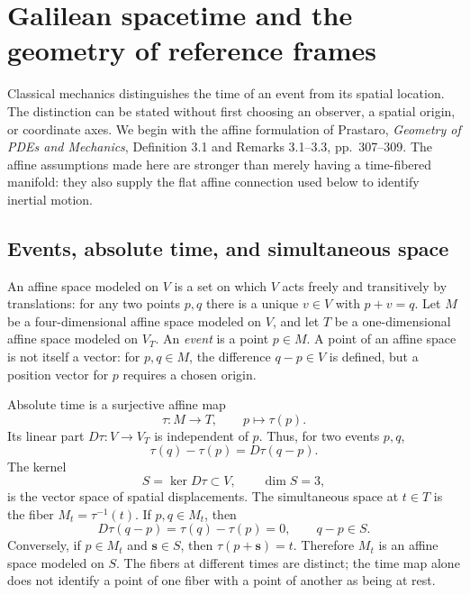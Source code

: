 \section{Galilean spacetime and the geometry of reference frames}

Classical mechanics distinguishes the time of an event from its spatial
location.  The distinction can be stated without first choosing an observer,
a spatial origin, or coordinate axes.  We begin with the affine formulation
of Prastaro, \emph{Geometry of PDEs and Mechanics}, Definition 3.1 and
Remarks 3.1--3.3, pp.~307--309.  The affine assumptions made here are
stronger than merely having a time-fibered manifold: they also supply the
flat affine connection used below to identify inertial motion.

\subsection{Events, absolute time, and simultaneous space}

An affine space modeled on $V$ is a set on which $V$ acts freely and
transitively by translations: for any two points $p,q$ there is a unique
$v\in V$ with $p+v=q$.  Let $M$ be a four-dimensional affine space modeled
on $V$, and let $T$ be a one-dimensional affine space modeled on $V_T$.  An
\emph{event} is a point $p\in M$.  A point of an affine space is not itself
a vector: for $p,q\in M$, the difference $q-p\in V$ is defined, but a
position vector for $p$ requires a chosen origin.

Absolute time is a surjective affine map
\begin{equation}\label{eq:gal-time}
 \tau:M\longrightarrow T,\qquad p\longmapsto\tau(p).
\end{equation}
Its linear part $D\tau:V\to V_T$ is independent of $p$.  Thus, for two
events $p,q$,
\begin{equation}\label{eq:gal-time-difference}
 \tau(q)-\tau(p)=D\tau(q-p).
\end{equation}
The kernel
\begin{equation}\label{eq:gal-spatial-vectors}
 S=\ker D\tau\subset V,\qquad \dim S=3,
\end{equation}
is the vector space of spatial displacements.  The simultaneous space at
$t\in T$ is the fiber $M_t=\tau^{-1}(t)$.  If $p,q\in M_t$, then
\begin{equation}\label{eq:gal-simultaneity}
 D\tau(q-p)=\tau(q)-\tau(p)=0,
 \qquad q-p\in S.
\end{equation}
Conversely, if $p\in M_t$ and $\mathbf s\in S$, then
$\tau(p+\mathbf s)=t$.  Therefore $M_t$ is an affine space modeled on $S$.
The fibers at different times are distinct; the time map alone does not
identify a point of one fiber with a point of another as being at rest.

